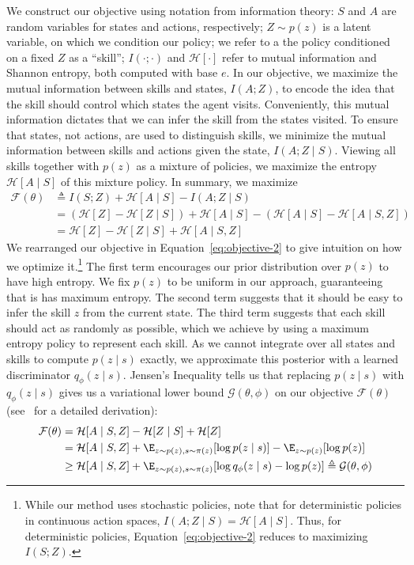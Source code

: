 \documentclass{article} %
\newcommand{\h}{\mathcal{H}}
\theoremstyle{questionstyle}\newtheorem{question}{Question}
\begin{document}
We construct our objective using notation from information theory: $S$ and $A$ are random variables for states and actions, respectively; $Z \sim p(z)$ is a latent variable, on which we condition our policy; we refer to a the policy conditioned on a fixed $Z$ as a ``skill''; $I(\cdot ; \cdot)$ and $\h[\cdot]$ refer to mutual information and Shannon entropy, both computed with base $e$. In our objective, we maximize the mutual information between skills and states, $I(A; Z)$, to encode the idea that the skill should control which states the agent visits. Conveniently, this mutual information dictates that we can infer the skill from the states visited.
To ensure that states, not actions, are used to distinguish skills, we minimize the mutual information between skills and  actions given the state, $I(A; Z \mid S)$.
Viewing all skills together with $p(z)$ as a mixture of policies, we maximize the entropy $\h[A \mid S]$ of this mixture policy.
In summary, we maximize
\begin{align}
\mathcal{F}(\theta) &\triangleq I(S; Z) + \h[A \mid S] - I(A; Z \mid S) \label{eq:objective} \\
                    &= (\h[Z] - \h[Z \mid S]) + \h[A \mid S] - (\h[A \mid S] - \h[A \mid S, Z]) \nonumber \\
                    &= \h[Z] - \h[Z \mid S] + \h[A \mid S, Z] \label{eq:objective-2}
\end{align}
We rearranged our objective in Equation~\ref{eq:objective-2} to give intuition on how we optimize it.\footnote{While our method uses stochastic policies, note that for deterministic policies in continuous action spaces, \mbox{$I(A; Z \mid S) = \h[A \mid S]$}. Thus, for deterministic policies, Equation~\ref{eq:objective-2} reduces to maximizing $I(S; Z)$.}
The first term encourages our prior distribution over $p(z)$ to have high entropy. We fix $p(z)$ to be uniform in our approach, guaranteeing that is has maximum entropy.
The second term suggests that it should be easy to infer the skill $z$ from the current state.
The third term suggests that each skill should act as randomly as possible, which we achieve by using a maximum entropy policy to represent each skill.
As we cannot integrate over all states and skills to compute $p(z \mid s)$ exactly, we approximate this posterior with a learned discriminator $q_{\phi}(z \mid s)$.
Jensen's Inequality tells us that replacing $p(z \mid s)$ with $q_{\phi}(z \mid s)$ gives us a variational lower bound $\mathcal{G}(\theta, \phi)$ on our objective $\mathcal{F}(\theta)$ (see~\citep{agakov2004algorithm} for a detailed derivation):
\begin{align*}
    \mathcal{F}(\theta) &= \h[A \mid S, Z] - \h[Z \mid S] + \h[Z] \\
                        &= \h[A \mid S, Z] + \E_{z \sim p(z), s \sim \pi(z)}[\log p(z \mid s)] - \E_{z \sim p(z)}[\log p(z)] \\
                        &\ge \h[A \mid S, Z] + \E_{z \sim p(z), s \sim \pi(z)}[\log q_{\phi}(z \mid s) - \log p(z)] \triangleq \mathcal{G}(\theta, \phi)
\end{align*}
\end{document}
